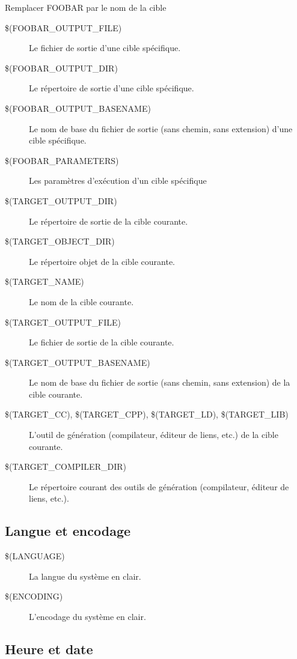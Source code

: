 Remplacer FOOBAR par le nom de la cible 

\begin{description}
\item[{\footnotesize \$(FOOBAR\_OUTPUT\_FILE)}] Le fichier de sortie d'une cible spécifique.
\item[{\footnotesize \$(FOOBAR\_OUTPUT\_DIR)}] Le répertoire de sortie d'une cible spécifique.
\item[{\footnotesize \$(FOOBAR\_OUTPUT\_BASENAME)}] Le nom de base du fichier de sortie (sans chemin, sans extension) d'une cible spécifique.
\item[{\footnotesize \$(FOOBAR\_PARAMETERS)}] Les paramètres d'exécution d'un cible spécifique
\item[{\footnotesize \$(TARGET\_OUTPUT\_DIR)}] Le répertoire de sortie de la cible courante.
\item[{\footnotesize \$(TARGET\_OBJECT\_DIR)}] Le répertoire objet de la cible courante.
\item[{\footnotesize \$(TARGET\_NAME)}] Le nom de la cible courante.
\item[{\footnotesize \$(TARGET\_OUTPUT\_FILE)}] Le fichier de sortie de la cible courante.
\item[{\footnotesize \$(TARGET\_OUTPUT\_BASENAME)}] Le nom de base du fichier de sortie (sans chemin, sans extension) de la cible courante.
\item[{\footnotesize \$(TARGET\_CC), \$(TARGET\_CPP), \$(TARGET\_LD), \$(TARGET\_LIB)}] L'outil de génération (compilateur, éditeur de liens, etc.) de la cible courante.
\item[{\footnotesize \$(TARGET\_COMPILER\_DIR)}] Le répertoire courant des outils de génération (compilateur, éditeur de liens, etc.).
\end{description}

\subsection{Langue et encodage}

\begin{description}
\item[{\footnotesize \$(LANGUAGE)}] La langue du système en clair.
\item[{\footnotesize \$(ENCODING)}] L'encodage du système en clair.
\end{description}

\subsection{Heure et date}


